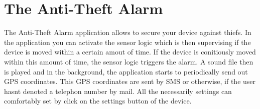 \documentclass{report}
\newcommand{\lfig}[1]{\label{fig:#1}}
\begin{document}




\section{The Anti-Theft Alarm}

The Anti-Theft Alarm application allows to secure your device against thiefs. In the application you can activate the sensor logic which is then supervising if the device is moved within a certain amout of time. If the device is conitiously moved within this amount of time, the sensor logic triggers the alarm. A sound file then is played and in the background, the application starts to periodically send out GPS coordinates. This GPS coordinates are sent by SMS or otherwise, if the user hasnt denoted a telephon number by mail. All the necessarily settings can comfortably set by click on the settings button of the device.
\end{document}

